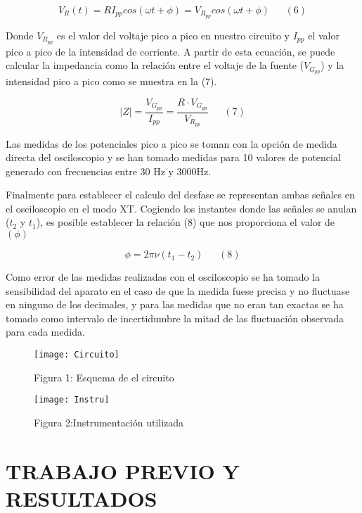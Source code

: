 \documentclass[article, 11pt]{report}
\begin{document}
	$$ V_R(t) = R I_{pp} cos(\omega t + \phi)  = V_{R_{pp}} cos(\omega t + \phi)  ~~~~~~~(6)$$
	
	Donde $V_{R_{pp}}$ es el valor del voltaje pico a pico en nuestro circuito y $I_{pp}$ el valor pico a pico de la intensidad de corriente. A partir de esta ecuación, se puede calcular la impedancia como la relación entre el voltaje de la fuente ($V_G_{pp}$)  y la intensidad pico a pico como se muestra en la (7).
	
	$$ |Z| = \dfrac{V_G_{pp}}{I_{pp}} = \dfrac{R \cdot V_G_{pp} }{V_R_{pp}}  ~~~~~~~(7)$$
	
	Las medidas de los potenciales pico a pico se toman con la opción de medida directa del osciloscopio y se han tomado medidas para 10 valores de potencial generado con frecuencias entre 30 Hz y 3000Hz. 
	
	Finalmente para establecer el calculo del desfase se representan ambas señales en el osciloscopio en el modo XT. Cogiendo los instantes donde las señales se anulan ($t_2$ y $t_1$), es posible establecer la relación (8) que nos proporciona el valor de $(\phi)$
	
	$$ \phi = 2 \pi \nu (t_1 - t_2)  ~~~~~~~(8)$$
	
	Como error de las medidas realizadas con el osciloscopio se ha tomado la sensibilidad del aparato en el caso de que la medida fuese precisa y no fluctuase en ninguno de los decimales, y para las medidas que no eran tan exactas se ha tomado como intervalo de incertidumbre la mitad de las fluctuación observada para cada medida.
	
	
	\begin{figure}[H]
		\centering
		\begin{minipage}{.45\textwidth}
			\centering
			\texttt{[image: Circuito]}
			\caption*{Figura 1: Esquema de el circuito
				}
		\end{minipage}%
		\begin{minipage}{.45\textwidth}
			\centering
			\texttt{[image: Instru]}
			\caption*{Figura 2:Instrumentación utilizada}
			
		\end{minipage}
	\end{figure}
	
	
	
	\section{TRABAJO PREVIO Y RESULTADOS}
	
\end{document}
